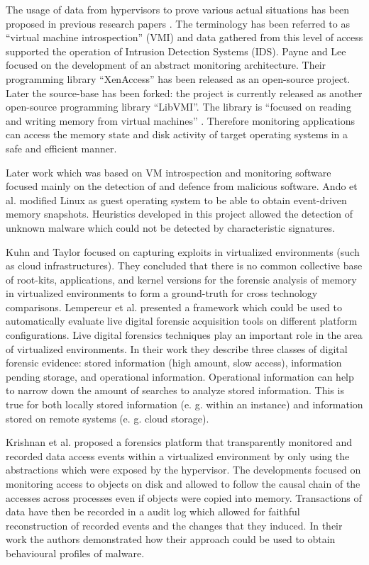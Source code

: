 \documentclass[runningheads,a4paper]{llncs}
\begin{document}
The usage of data from hypervisors to prove various actual situations has been proposed in previous research papers \cite{Garfinkel2003,Kourai2005}. The terminology has been referred to as ``virtual machine introspection'' (VMI) and data gathered from this level of access supported the operation of Intrusion Detection Systems (IDS). Payne and Lee \cite{Payne2007} focused on the development of an abstract monitoring architecture. Their programming library ``XenAccess'' has been released as an open-source project. Later the source-base has been forked: the project is currently released as another open-source programming library ``LibVMI''. The library is ``focused on reading and writing memory from virtual machines'' \cite{libvmi}. Therefore monitoring applications can access the memory state and disk activity of target operating systems in a safe and efficient manner. 

Later work which was based on VM introspection and monitoring software focused mainly on the detection of and defence from malicious software. Ando et al. \cite{Ando2007} modified Linux as guest operating system to be able to obtain event-driven memory snapshots. Heuristics developed in this project allowed the detection of unknown malware which could not be detected by characteristic signatures. 

Kuhn and Taylor \cite{Kuhn2011} focused on capturing exploits in virtualized environments (such as cloud infrastructures). They concluded that there is no common collective base of root-kits, applications, and kernel versions for the forensic analysis of memory in virtualized environments to form a ground-truth for cross technology comparisons. Lempereur et al. \cite{Lempereur2010} presented a framework which could be used to automatically evaluate live digital forensic acquisition tools on different platform configurations. Live digital forensics techniques play an important role in the area of virtualized environments. In their work they describe three classes of digital forensic evidence: stored information (high amount, slow access), information pending storage, and operational information. Operational information can help to narrow down the amount of searches to analyze stored information. This is true for both locally stored information (e. g. within an instance) and information stored on remote systems (e. g. cloud storage). 

Krishnan et al. \cite{Krishnan2010} proposed a forensics platform that transparently monitored and recorded data access events within a virtualized environment by only using the abstractions which were exposed by the hypervisor. The developments focused on monitoring access to objects on disk and allowed to follow the causal chain of the accesses across processes even if objects were copied into memory. Transactions of data have then be recorded in a audit log which allowed for faithful reconstruction of recorded events and the changes that they induced. In their work the authors demonstrated how their approach could be used to obtain behavioural profiles of malware. 
\end{document}
